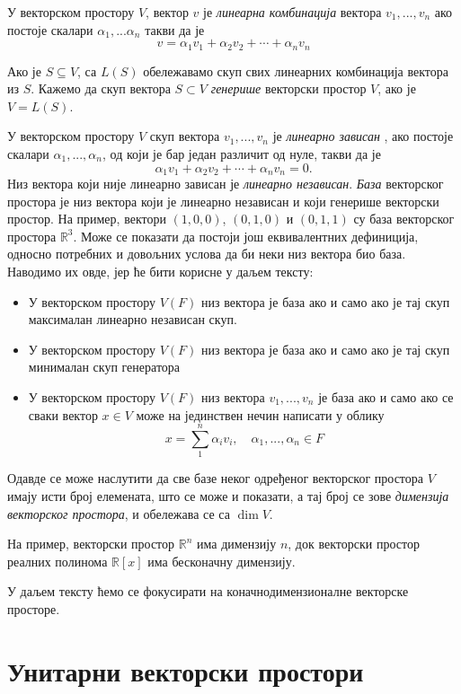 \documentclass{report}
\theoremstyle{plain}
\theoremstyle{definition}
\begin{document}
У векторском простору $V$, вектор $v$ је \emph{линеарна комбинација} вектора $v_1, ..., v_n$ ако постоје скалари $\alpha_1, ...\alpha_n$ такви да је $$v = \alpha_1 v_1+ \alpha_2 v_2+ \cdots+\alpha_n v_n$$

Ако је $S\subseteq V$, са $L(S)$ обележавамо скуп свих линеарних комбинација вектора из $S$. Кажемо да скуп вектора $S\subset V$ \emph{генерише} векторски простор $V$, ако је $V = L(S)$.

У векторском простору $V$ скуп вектора $v_1, ...,v_n$ је \emph{линеарно зависан} , ако постоје скалари $\alpha_1, ...,\alpha_n$, од који је бар један различит од нуле, такви да је $$\alpha_1 v_1 + \alpha_2 v_2 + \cdots+\alpha_n v_n = 0.$$ Низ вектора који није линеарно зависан је \emph{линеарно независан}.
\emph{База} векторског простора је низ вектора који је линеарно независан и који генерише векторски простор.
На пример, вектори $(1, 0, 0)$, $(0, 1, 0)$ и $(0, 1, 1)$ су база векторског простора $\mathbb{R}^3$.
Може се показати да постоји још еквивалентних дефиниција, односно потребних и довољних услова да би неки низ вектора био база. Наводимо их овде, јер ће бити корисне у даљем тексту:
\begin{itemize}
  \item У векторском простору $V(F)$ низ вектора је база ако и само ако је тај скуп максималан линеарно независан скуп.
  \item У векторском простору $V(F)$ низ вектора је база ако и само ако је тај скуп минималан скуп генератора
  \item У векторском простору $V(F)$ низ вектора $v_1, ..., v_n$ је база ако и само ако се сваки вектор $x\in V$ може на јединствен нечин написати у облику $$x = \sum_1^n\alpha_i v_i, \quad \alpha_1, ..., \alpha_n\in F$$
\end{itemize}
Одавде се може наслутити да све базе неког одређеног векторског простора $V$ имају исти број елемената, што се може и показати, а тај број се зове \emph{димензија векторског простора}, и обележава се са $\operatorname{dim} V$. 

На пример, векторски простор $\mathbb{R}^n$ има димензију $n$, док векторски простор реалних полинома $\mathbb{R}[x]$ има бесконачну димензију.

У даљем тексту ћемо се фокусирати на коначнодимензионалне векторске просторе.

\section{Унитарни векторски простори}
\end{document}
